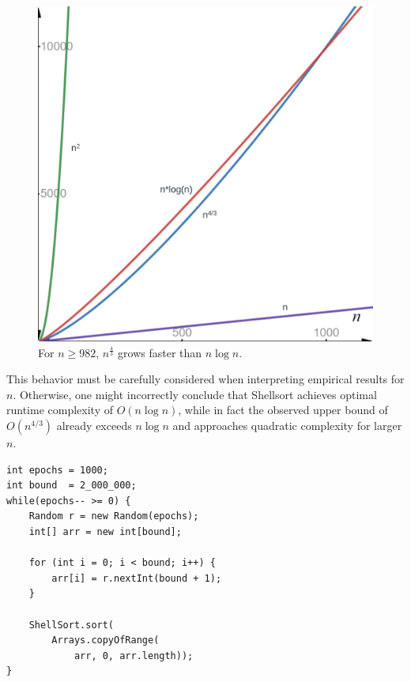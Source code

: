 \begin{figure}[!h]
    \centering
    \includegraphics[width=1\columnwidth]{img/lognplot}
    \caption{For $n \geq 982$, $n^{\frac{4}{3}}$ grows faster than $n \log n$.}
    \label{fig:lognplot}
\end{figure}

\noindent
This behavior must be carefully considered when interpreting empirical results for $n$.
Otherwise, one might incorrectly conclude that Shellsort achieves optimal runtime complexity of $O(n \log n)$, while in fact the observed upper bound of $O(n^{4/3})$ already exceeds $n \log n$ and approaches quadratic complexity for larger $n$.



\vspace{4mm}
\begin{lstlisting}[style=javastyle, caption={Code for Shellsort-testing large randomized arrays.}, label=lst:rand]
int epochs = 1000;
int bound  = 2_000_000;
while(epochs-- >= 0) {
    Random r = new Random(epochs);
    int[] arr = new int[bound];

    for (int i = 0; i < bound; i++) {
        arr[i] = r.nextInt(bound + 1);
    }

    ShellSort.sort(
        Arrays.copyOfRange(
            arr, 0, arr.length));
}
\end{lstlisting}
\vspace{4mm}


